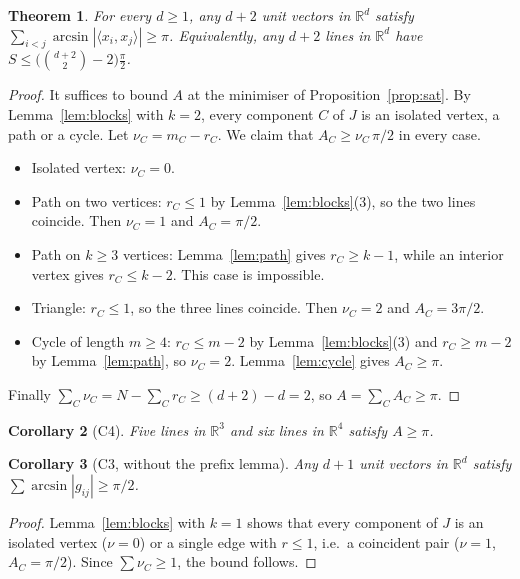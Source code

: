 \documentclass[11pt]{article}
\newtheorem{theorem}{Theorem}
\newtheorem{corollary}[theorem]{Corollary}
\theoremstyle{remark}
\begin{document}
\begin{theorem}\label{thm:main}
For every $d\ge1$, any $d+2$ unit vectors in $\mathbb R^d$ satisfy
$\sum_{i<j}\arcsin|\langle x_i,x_j\rangle|\ge\pi$. Equivalently, any
$d+2$ lines in $\mathbb R^d$ have
$S\le\bigl(\binom{d+2}2-2\bigr)\frac\pi2$.
\end{theorem}
\begin{proof}
It suffices to bound $A$ at the minimiser of Proposition~\ref{prop:sat}.
By Lemma~\ref{lem:blocks} with $k=2$, every component $C$ of $J$ is an
isolated vertex, a path or a cycle. Let $\nu_C=m_C-r_C$. We claim that
$A_C\ge\nu_C\,\pi/2$ in every case.
\begin{itemize}
\item Isolated vertex: $\nu_C=0$.
\item Path on two vertices: $r_C\le1$ by Lemma~\ref{lem:blocks}(3), so the two lines coincide. Then
$\nu_C=1$ and $A_C=\pi/2$.
\item Path on $k\ge3$ vertices: Lemma~\ref{lem:path} gives $r_C\ge k-1$, while an interior vertex gives
$r_C\le k-2$. This case is impossible.
\item Triangle: $r_C\le1$, so the three lines coincide. Then $\nu_C=2$ and $A_C=3\pi/2$.
\item Cycle of length $m\ge4$: $r_C\le m-2$ by Lemma~\ref{lem:blocks}(3) and
$r_C\ge m-2$ by Lemma~\ref{lem:path}, so $\nu_C=2$. Lemma~\ref{lem:cycle} gives $A_C\ge\pi$.
\end{itemize}
Finally $\sum_C\nu_C=N-\sum_Cr_C\ge (d+2)-d=2$, so
$A=\sum_CA_C\ge\pi$.
\end{proof}

\begin{corollary}[C4]
Five lines in $\mathbb R^3$ and six lines in $\mathbb R^4$ satisfy
$A\ge\pi$.
\end{corollary}

\begin{corollary}[C3, without the prefix lemma]
Any $d+1$ unit vectors in $\mathbb R^d$ satisfy $\sum\arcsin|g_{ij}|\ge\pi/2$.
\end{corollary}
\begin{proof}
Lemma~\ref{lem:blocks} with $k=1$ shows that every component of $J$ is an isolated vertex
($\nu=0$) or a single edge with $r\le1$, i.e.\ a coincident pair
($\nu=1$, $A_C=\pi/2$). Since $\sum\nu_C\ge1$, the bound follows.
\end{proof}
\end{document}

